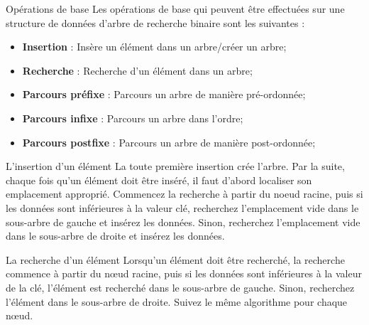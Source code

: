 \documentclass[10pt,xcolor=dvipsnames]{beamer}
\begin{document}
\begin{frame}{Opérations de base}
    Les opérations de base qui peuvent être effectuées sur une structure de données d'arbre de recherche binaire sont les suivantes :
    
    \begin{itemize}
        \item \textbf{\alert{Insertion}} : Insère un élément dans un arbre/créer un arbre;
        \item \textbf{\alert{Recherche}} :  Recherche d'un élément dans un arbre;
        \item \textbf{\alert{Parcours préfixe}}  : Parcours un arbre de manière pré-ordonnée;
        \item \textbf{\alert{Parcours infixe}}  : Parcours un arbre dans l'ordre;
        \item \textbf{\alert{Parcours postfixe}}  : Parcours un arbre de manière post-ordonnée;

    \end{itemize}
\end{frame}


\begin{frame}{L'insertion d'un élément}
    La toute première \alert{insertion} crée l'arbre. Par la suite, chaque fois qu'un élément doit être inséré, il faut d'abord localiser son emplacement approprié. Commencez la recherche à partir du noeud racine, puis si les données sont inférieures à la valeur clé, recherchez l'emplacement vide dans le sous-arbre de gauche et insérez les données. Sinon, recherchez l'emplacement vide dans le sous-arbre de droite et insérez les données.
    
\end{frame}

\begin{frame}{La recherche d'un élément}
    Lorsqu'un élément doit être \alert{recherché}, la recherche commence à partir du nœud racine, puis si les données sont inférieures à la valeur de la clé, l'élément est recherché dans le sous-arbre de gauche. Sinon, recherchez l'élément dans le sous-arbre de droite. Suivez le même algorithme pour chaque nœud.
    
\end{frame}
\end{document}
